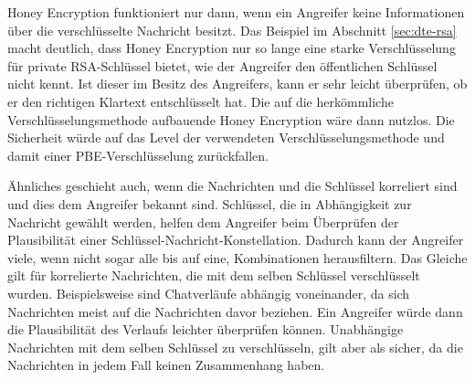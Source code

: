 Honey Encryption funktioniert nur dann, wenn ein Angreifer keine Informationen über die verschlüsselte Nachricht besitzt. Das Beispiel im Abschnitt \ref{sec:dte-rsa} macht deutlich, dass Honey Encryption nur so lange eine starke Verschlüsselung für private RSA-Schlüssel bietet, wie der Angreifer den öffentlichen Schlüssel nicht kennt. Ist dieser im Besitz des Angreifers, kann er sehr leicht überprüfen, ob er den richtigen Klartext entschlüsselt hat. Die auf die herkömmliche Verschlüsselungsmethode aufbauende Honey Encryption wäre dann nutzlos. Die Sicherheit würde auf das Level der verwendeten Verschlüsselungsmethode und damit einer PBE-Verschlüsselung zurückfallen.

Ähnliches geschieht auch, wenn die Nachrichten und die Schlüssel korreliert sind und dies dem Angreifer bekannt sind. Schlüssel, die in Abhängigkeit zur Nachricht gewählt werden, helfen dem Angreifer beim Überprüfen der Plausibilität einer Schlüssel-Nachricht-Konstellation. Dadurch kann der Angreifer viele, wenn nicht sogar alle bis auf eine, Kombinationen herausfiltern. Das Gleiche gilt für korrelierte Nachrichten, die mit dem selben Schlüssel verschlüsselt wurden. Beispielsweise sind Chatverläufe abhängig voneinander, da sich Nachrichten meist auf die Nachrichten davor beziehen. Ein Angreifer würde dann die Plausibilität des Verlaufs leichter überprüfen können. Unabhängige Nachrichten mit dem selben Schlüssel zu verschlüsseln, gilt aber als sicher, da die Nachrichten in jedem Fall keinen Zusammenhang haben.